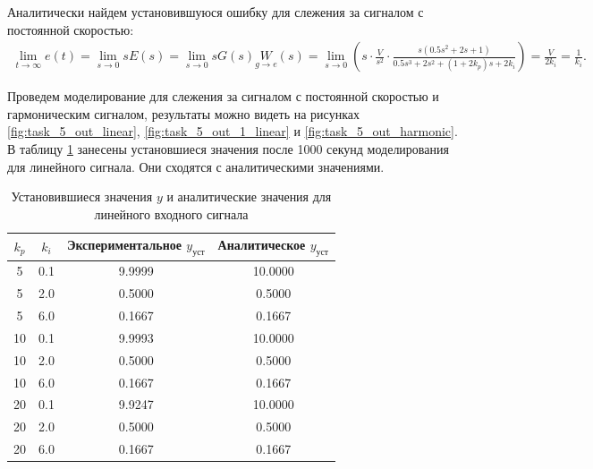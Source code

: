 Аналитически найдем установившуюся ошибку для слежения за сигналом с постоянной скоростью:
\begin{multline*}
    \lim_{t\rightarrow\infty}e(t)
    =\lim_{s\rightarrow0}sE(s)=\lim_{s\rightarrow0}sG(s)\underset{g\rightarrow e}{W}(s)
    =\lim_{s\rightarrow0}\left(s\cdot\frac{V}{s^2}\cdot\frac{s(0.5s^2+2s+1)}{0.5s^3+2s^2+(1+2k_p)s+2k_i}\right)
    =\frac{V}{2k_i}=\frac{1}{k_i}.
\end{multline*}

Проведем моделирование для слежения за сигналом с постоянной скоростью и гармоническим
сигналом, результаты можно видеть на рисунках \ref{fig:task_5_out_linear}, \ref{fig:task_5_out_1_linear} и \ref{fig:task_5_out_harmonic}.
В таблицу \ref{tab:task_5_out} занесены установшиеся значения после 1000 секунд
моделирования для линейного сигнала. Они сходятся с аналитическими значениями.

\begin{table}[H]
    \centering
    \caption{Установившиеся значения $y$ и аналитические значения для линейного входного сигнала}
    \begin{tabular}{|c|c|c|c|}
        \hline
        $k_p$ & $k_i$ & Экспериментальное $y_{\text{уст}}$ & Аналитическое $y_{\text{уст}}$\\ \hline
        5 & 0.1 & 9.9999 & 10.0000 \\
        5 & 2.0 & 0.5000 & 0.5000 \\
        5 & 6.0 & 0.1667 & 0.1667 \\
        10 & 0.1 & 9.9993 & 10.0000 \\
        10 & 2.0 & 0.5000 & 0.5000 \\
        10 & 6.0 & 0.1667 & 0.1667 \\
        20 & 0.1 & 9.9247 & 10.0000 \\
        20 & 2.0 & 0.5000 & 0.5000 \\
        20 & 6.0 & 0.1667 & 0.1667 \\ \hline
    \end{tabular}
    \label{tab:task_5_out}
\end{table}

